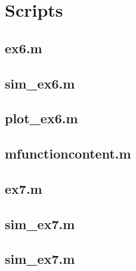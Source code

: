 \section*{Scripts}
    \subsection*{ex6.m}
    \label{subsec:ex6}
    

    \subsection*{sim\_ex6.m}
    \label{subsec:simex6}
    

    \subsection*{plot\_ex6.m}
    \label{subsec:plotex6}
    
    
    \subsection*{mfunctioncontent.m}
    \label{subsec:mfunctionex6}
    
    
    \subsection*{ex7.m}
    \label{subsec:ex7}
    
    
    \subsection*{sim\_ex7.m}
    \label{subsec:simex7}
    
    
    \subsection*{sim\_ex7.m}
    \label{subsec:simex7}
    
    
